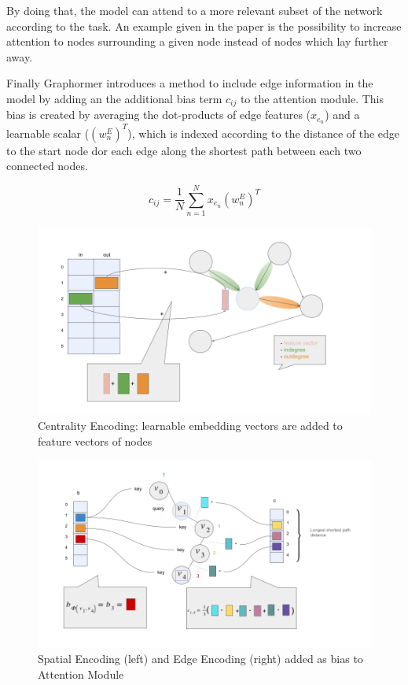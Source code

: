 By doing that, the model can attend to a more relevant subset of the network according to the task. An example given in the paper is the possibility to increase attention to nodes surrounding a given node instead of nodes which lay further away.

Finally Graphormer introduces a method to include edge information in the model by adding an the additional bias term $c_{ij}$ to the attention module. This bias is created by averaging the dot-products of edge features ($x_{e_n}$) and a learnable scalar ($(w_n^E)^T$), which is indexed according to the distance of the edge to the start node dor each edge along the shortest path between each two connected nodes.

\begin{equation}
    c_{ij} = \frac{1}{N} \sum_{n=1}^{N} x_{e_n}(w_n^E)^T
\end{equation}

\begin{figure}
    \centering
    \includegraphics[scale=0.4]{tex/res/graphormer_centr_enc.png}
    \caption{Centrality Encoding: learnable embedding vectors are added to feature vectors of nodes}
    \label{fig:graphormer_centr_enc}
\end{figure}

\begin{figure}
    \centering
    \includegraphics[scale=0.4]{tex/res/graphormer_attention.png}
    \caption{Spatial Encoding (left) and Edge Encoding (right) added as bias to Attention Module}
    \label{fig:graphormer_att}
\end{figure}

